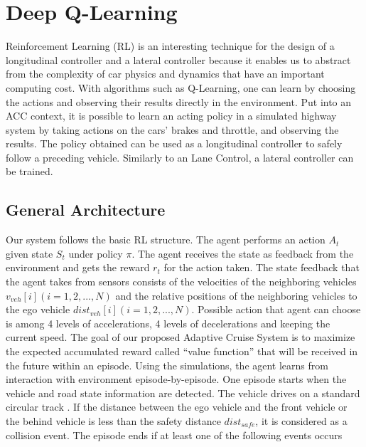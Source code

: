 \chapter{Deep Q-Learning}

Reinforcement Learning (RL) is an interesting technique for the design of a longitudinal controller and a lateral controller because it enables us to abstract from the complexity of car physics and dynamics that have an important computing cost. With algorithms such as Q-Learning, one can learn by choosing the actions and observing their results directly in the environment. Put into an ACC context, it is possible to learn an acting policy in a simulated highway system by taking actions on the cars' brakes and throttle, and observing the results. The policy obtained can be used as a longitudinal controller to safely follow a preceding vehicle. Similarly to an Lane Control, a lateral controller can be trained.

\section{General Architecture}

Our system follows the basic RL structure. The agent performs an action $A_t$ given state $S_t$ under policy $\pi$. The agent receives the state as feedback from the environment and gets the reward $r_t$ for the action taken. The state feedback that the agent takes from sensors consists of the velocities of the neighboring vehicles $v_{veh}[i] (i = 1, 2, ..., N)$ and the relative positions of the neighboring vehicles to the ego vehicle $dist_{veh}[i] (i = 1, 2, ..., N)$. Possible action that agent can choose is among 4 levels of accelerations, 4 levels of decelerations and keeping the current speed. The goal of our proposed Adaptive Cruise System is to maximize the expected accumulated reward called ``value function'' that will be received in the future within an episode. Using the simulations, the agent learns from interaction with environment episode-by-episode. One episode starts when the vehicle and road state information are detected. The vehicle drives on a standard circular track . If the distance between the ego vehicle and the front vehicle or the behind vehicle is less than the safety distance $dist_{safe}$, it is considered as a collision event. The episode ends if at least one of the following events occurs

